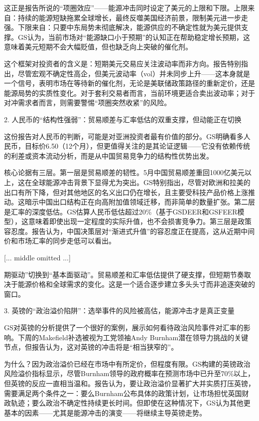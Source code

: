 \documentclass[11pt]{ctexart}
\begin{document}
这正是报告所说的“项圈效应”——能源冲击同时设定了美元的上限和下限。上限来自：持续的能源短缺拖累全球增长，最终反噬美国经济前景，限制美元进一步走强。下限来自：只要中东局势未彻底解决，能源供应的不确定性就为美元提供支撑。GS认为，当前市场对“能源缺口小于预期”的认知正在帮助稳定增长预期，这意味着美元短期不会大幅贬值，但也缺乏向上突破的催化剂。

这个框架对投资者的含义是：短期美元交易应关注波动率而非方向。报告特别指出，尽管宏观不确定性高企，但美元波动率（vol）并未同步上升——这本身就是一个信号，表明市场在等待新的催化剂，无论是美联储政策路径的重新定价，还是能源局势的实质性变化。对于套利交易者而言，当前环境更适合卖出波动率；对于对冲需求者而言，则需要警惕“项圈突然收紧”的风险。

2. 人民币的“结构性强弱”：贸易顺差与汇率低估的双重支撑，但动能正在切换

这份报告对人民币的判断，可能是对亚洲投资者最有价值的部分。GS明确看多人民币，目标价6.50（12个月），但更值得关注的是其论证逻辑——它没有依赖传统的利差或资本流动分析，而是从中国贸易竞争力的结构性优势出发。

核心论据有三层。第一层是贸易顺差的韧性。5月中国贸易顺差重回1000亿美元以上，这在全球能源冲击背景下显得尤为突出。GS特别指出，尽管对欧洲和拉美的出口有所下降，但对其他地区的名义出口仍在增长，且主要受科技产品价格上涨推动。这暗示中国出口结构正在向高附加值领域迁移，而非简单的数量扩张。第二层是汇率的深度低估。GS估算人民币低估超过20\%（基于GSDEER和GSFEER模型），这意味着即使出现一定程度的实际升值，也不会损害竞争力。第三层是政策容忍度。报告认为，中国决策层对“渐进式升值”的容忍度正在提高，这从近期中间价和市场汇率的同步走低可以看出。

[... middle omitted ...]

期驱动”切换到“基本面驱动”。贸易顺差和汇率低估提供了硬支撑，但短期节奏取决于能源价格和全球需求的变化。这是一个适合逐步建立多头头寸而非追逐突破的窗口。

3. 英镑的“政治溢价陷阱”：选举事件的风险被高估，能源冲击才是真正变量

GS对英镑的分析提供了一个很好的案例，展示如何看待政治风险事件对汇率的影响。下周的Makefield补选被视为工党领袖Andy Burnham潜在领导力挑战的关键节点，但报告认为，这对英镑的冲击将是“相当狭窄的”。

为什么？因为政治溢价已经在市场中有所定价，但程度有限。GS构建的英镑政治风险溢价指标显示，尽管Burnham领导的政府概率在预测市场中已升至70\%以上，但英镑的反应一直相当温和。报告认为，要让政治溢价显著扩大并实质打压英镑，需要满足两个条件之一：要么Burnham公布具体的政策计划，让市场担忧英国财政轨迹；要么政治不确定性持续更长时间。但即使在这种情况下，GS认为其他更基本的因素——尤其是能源冲击的演变——将继续主导英镑走势。
\end{document}
